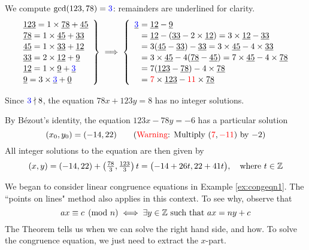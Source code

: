 \begin{example}{}{}
	We compute $\gcd(123,78) =\textcolor{blue}{3}$: remainders are underlined for clarity.
  \[\def\arraystretch{1.1}
  \def\ul#1{\underline{#1}}
  \left.\begin{array}{l}
	\ul{123}=1\times \ul{78}+\ul{45}\\
	\ul{78}=1\times \ul{45}+\ul{33}\\
	\ul{45}=1\times \ul{33}+\ul{12}\\
	\ul{33}=2\times \ul{12}+\ul 9\\
	\ul{12}=1\times \ul 9+\ul{\textcolor{blue}{3}}\\
	\ul 9=3\times \ul{\textcolor{blue}{3}}+\ul 0
  \end{array}\right\}
  \implies
  \left\{\begin{array}{r@{\,\,}l}
	\ul{\textcolor{blue}{3}}&=\ul{12}-\ul 9\\
	&=\ul{12}-(\ul{33}-2\times \ul{12}) =3\times \ul{12}-\ul{33}\\
	&=3(\ul{45}-\ul{33})-\ul{33} =3\times \ul{45}-4\times \ul{33}\\
	&=3\times \ul{45}-4(\ul{78}-\ul{45}) =7\times \ul{45}-4\times \ul{78}\\
	&=7(\ul{123}-\ul{78})-4\times \ul{78}\\
  &=\textcolor{red}{7}\times \ul{123}-\textcolor{red}{11}\times \ul{78}
  \end{array}\right.
  \]
  \begin{enumeratea}
  	\item Since $\textcolor{blue}{3}\nmid 8$, the equation $78x+123y=8$ has no integer solutions.
  	\item By Bézout's identity, the equation $123x-78y=-6$ has a particular solution
  	\[
  		(x_0,y_0)=(-14,22) \tag{\textcolor{red}{Warning}: Multiply $(\textcolor{red}{7},\textcolor{red}{-11})$ by $-2$}
  	\]
  	All integer solutions to the equation are then given by
  	\[
  		(x,y)=(-14,22)+\left(\tfrac{78}3,\tfrac{123}3\right)t=\bigl(-14+26t,22+41t\bigr),\quad\text{where }t\in\mathbb{Z}
  	\]
	\end{enumeratea}
\end{example}




We began to consider linear congruence equations in Example \ref{ex:congeqn1}. The ``points on lines" method also applies in this context. To see why, observe that
\[
	ax\equiv c\pmod n\iff \exists y\in\mathbb{Z}\text{ such that }ax=ny+c
\]
The Theorem tells us when we can solve the right hand side, and how. To solve the congruence equation, we just need to extract the $x$-part.

